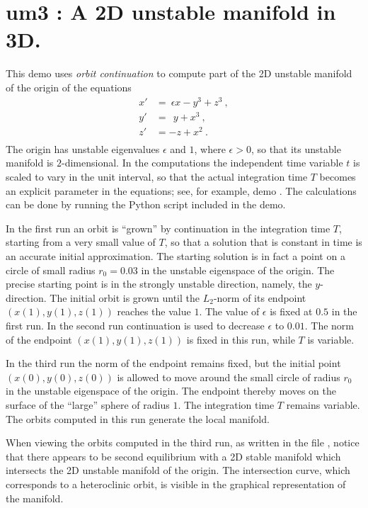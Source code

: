 \documentclass[12pt]{report}
\def\eps{\epsilon}
\begin{document}
\section{ um3 : A 2D unstable manifold in 3D.} \label{sec:Demos_um3}
This demo uses {\it orbit continuation} to compute part of the 2D unstable 
manifold of the origin of the equations
\begin{equation} \begin{array}{cl}
 x' &= ~\eps x - y^3 + z^3~, \\
 y' &=   ~~y + x^3~, \\
 z' &=    -z + x^2~. \\
\end{array} \end{equation}
The origin has unstable eigenvalues $\eps$ and $1$, where $\eps>0$, so that its 
unstable manifold is $2$-dimensional. 
In the computations the independent time variable $t$ is scaled to vary in
the unit interval, so that the actual integration time $T$ becomes an 
explicit parameter in the equations; see, for example, demo .
The calculations can be done by running the Python script  
included in the demo. 

In the first run an orbit is ``grown'' by continuation in the integration time 
$T$, starting from a very small value of $T$, so that a solution that is
constant in time is an accurate initial approximation. The starting solution is 
in fact a point on a circle of small radius $r_0=0.03$ in the unstable eigenspace
of the origin. 
The precise starting point is in the strongly unstable direction, namely, the
$y$-direction.
The initial orbit is grown until the $L_2$-norm of its endpoint 
$(x(1),y(1),z(1))$ reaches the value $1$. 
The value of $\eps$ is fixed at $0.5$ in the first run. In the second run 
continuation is used to decrease $\eps$ to $0.01$. The norm of the endpoint  
$(x(1),y(1),z(1))$ is fixed in this run, while $T$ is variable.

In the third run the norm of the endpoint remains fixed, but the 
initial point $(x(0),y(0),z(0))$ is allowed to move around the small circle of 
radius $r_0$ in the unstable eigenspace of the origin.  
The endpoint thereby moves on the surface of the ``large'' sphere of radius 
$1$. The integration time $T$ remains variable.
The orbits computed in this run generate the local manifold.

When viewing the orbits computed in the third run, as written in the file 
, notice that there appears to be second equilibrium with a 2D 
stable manifold which intersects the 2D unstable manifold of the origin. 
The intersection curve, which corresponds to a heteroclinic orbit,
is visible in the graphical representation of the manifold. 
\end{document}
